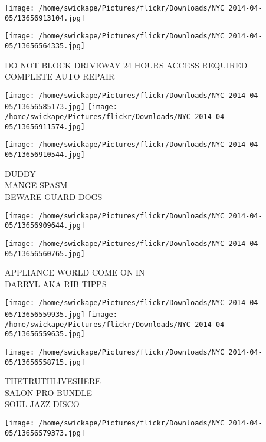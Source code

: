 \documentclass[10pt,letterpaper]{article}
\begin{document}
\texttt{[image: /home/swickape/Pictures/flickr/Downloads/NYC 2014-04-05/13656913104.jpg]}

\vspace{0.25in}
\texttt{[image: /home/swickape/Pictures/flickr/Downloads/NYC 2014-04-05/13656564335.jpg]}

DO NOT BLOCK DRIVEWAY 24 HOURS ACCESS REQUIRED\\
COMPLETE AUTO REPAIR\\
\pagebreak

\texttt{[image: /home/swickape/Pictures/flickr/Downloads/NYC 2014-04-05/13656585173.jpg]}
\texttt{[image: /home/swickape/Pictures/flickr/Downloads/NYC 2014-04-05/13656911574.jpg]}

\vspace{0.25in}
\texttt{[image: /home/swickape/Pictures/flickr/Downloads/NYC 2014-04-05/13656910544.jpg]}

DUDDY\\
MANGE SPASM\\
BEWARE GUARD DOGS\\
\pagebreak

\texttt{[image: /home/swickape/Pictures/flickr/Downloads/NYC 2014-04-05/13656909644.jpg]}

\vspace{0.25in}
\texttt{[image: /home/swickape/Pictures/flickr/Downloads/NYC 2014-04-05/13656560765.jpg]}

APPLIANCE WORLD COME ON IN\\
DARRYL AKA RIB TIPPS\\
\pagebreak

\texttt{[image: /home/swickape/Pictures/flickr/Downloads/NYC 2014-04-05/13656559935.jpg]}
\texttt{[image: /home/swickape/Pictures/flickr/Downloads/NYC 2014-04-05/13656559635.jpg]}

\vspace{0.25in}
\texttt{[image: /home/swickape/Pictures/flickr/Downloads/NYC 2014-04-05/13656558715.jpg]}

THETRUTHLIVESHERE\\
SALON PRO BUNDLE\\
SOUL JAZZ DISCO\\
\pagebreak

\texttt{[image: /home/swickape/Pictures/flickr/Downloads/NYC 2014-04-05/13656579373.jpg]}
\end{document}
